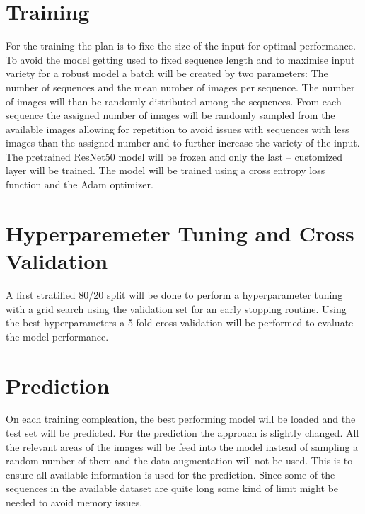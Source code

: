 \documentclass{article}
\begin{document}
\section*{Training} %

For the training the plan is to fixe the size of the input for optimal performance. To avoid the model getting used to 
fixed sequence length and to maximise input variety for a robust model a batch will be created by two parameters: 
The number of sequences and the mean number of images per sequence. The number of images will than be randomly 
distributed among the sequences. From each sequence the assigned number of images will be randomly sampled
from the available images allowing for repetition to avoid issues with sequences with less images than the 
assigned number and to further increase the variety of the input. The pretrained ResNet50 model will be frozen and only 
the last -- customized layer will be trained. The model will be trained using a cross entropy loss function and the 
Adam optimizer.

\section*{Hyperparemeter Tuning and Cross Validation} %

A first stratified 80/20 split will be done to perform a hyperparameter tuning with a grid search using the validation
set for an early stopping routine. Using the best hyperparameters a 5 fold cross validation will be performed to
evaluate the model performance.

\section*{Prediction} %

On each training compleation, the best performing model will be loaded and the test set will be predicted. 
For the prediction the approach is slightly changed. All the relevant areas of the images will be feed into the model 
instead of sampling a random number of them and the data augmentation will not be used. 
This is to ensure all available information is used for the prediction. Since some of the sequences in the available 
dataset are quite long some kind of limit might be needed to avoid memory issues.


\printbibliography
\end{document}
